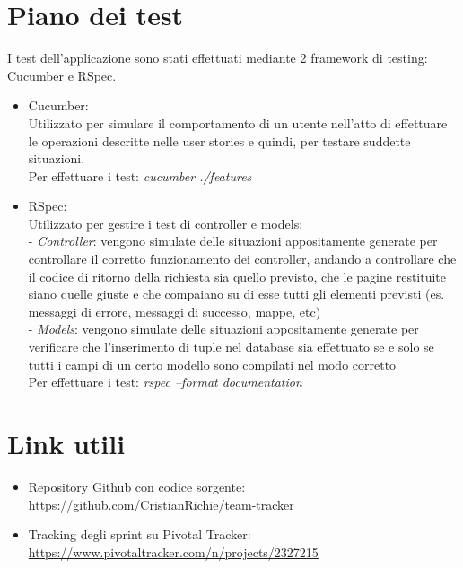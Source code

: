 \documentclass[a4paper,12pt]{extarticle}
\begin{document}
\section{Piano dei test}
I test dell'applicazione sono stati effettuati mediante 2 framework di testing: Cucumber e RSpec.
\begin{itemize}
    \item Cucumber: \\
        Utilizzato per simulare il comportamento di un utente nell'atto di effettuare le operazioni
        descritte nelle user stories e quindi, per testare suddette situazioni. \\
        Per effettuare i test: \textit{cucumber ./features}
    \item RSpec: \\
        Utilizzato per gestire i test di controller e models: \\ 
         - \textit{Controller}: vengono simulate delle situazioni appositamente generate per controllare il corretto
         funzionamento dei controller, andando a controllare che il codice di ritorno della richiesta sia quello
         previsto, che le pagine restituite siano quelle giuste e che compaiano su di esse tutti gli elementi 
         previsti (es. messaggi di errore, messaggi di successo, mappe, etc) \\ 
         - \textit{Models}: vengono simulate delle situazioni appositamente generate per verificare che l'inserimento
         di tuple nel database sia effettuato se e solo se tutti i campi di un certo modello sono compilati
         nel modo corretto \\
        Per effettuare i test: \textit{rspec --format documentation}
\end{itemize}

\section{Link utili}
\begin{itemize}
    \item Repository Github con codice sorgente: \\ \href{https://github.com/CristianRichie/team-tracker}{https://github.com/CristianRichie/team-tracker}
    \item Tracking degli sprint su Pivotal Tracker: \\ \href{https://www.pivotaltracker.com/n/projects/2327215}{https://www.pivotaltracker.com/n/projects/2327215}
\end{itemize}
\end{document}
